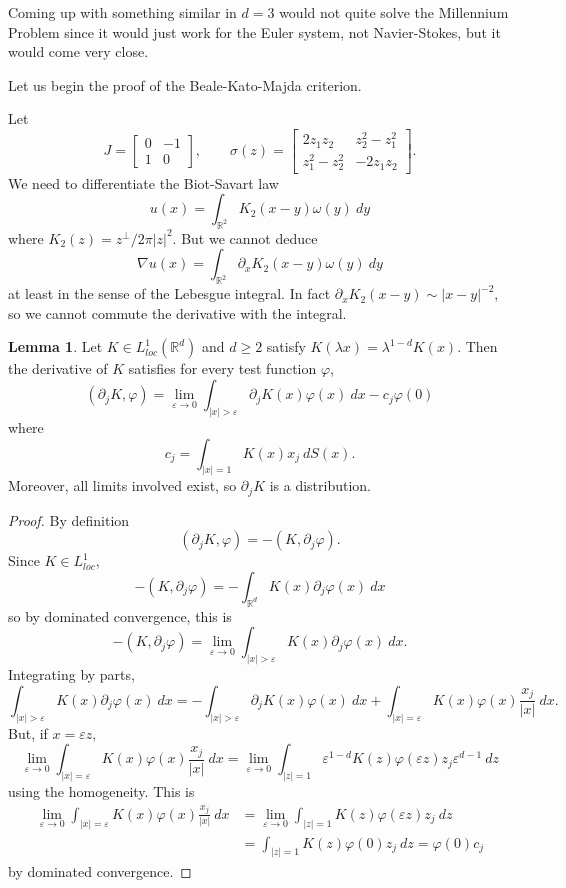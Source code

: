 \documentclass[12pt]{book}
\newcommand{\RR}{\mathbb{R}}
\theoremstyle{definition}
\newtheorem{lemma}[theorem]{Lemma}
\begin{document}
Coming up with something similar in $d = 3$ would not quite solve the Millennium Problem since it would just work for the Euler system, not Navier-Stokes, but it would come very close.

Let us begin the proof of the Beale-Kato-Majda criterion.

Let
$$J = \begin{bmatrix}0 & -1\\1 & 0\end{bmatrix}, \qquad \sigma(z) = \begin{bmatrix}2z_1z_2 & z_2^2 - z_1^2 \\ z_1^2 - z_2^2 & -2z_1z_2\end{bmatrix}.$$
We need to differentiate the Biot-Savart law
$$u(x) = \int_{\RR^2} K_2(x - y) \omega(y) ~dy$$
where $K_2(z) = z^\perp/2\pi|z|^2$. But we cannot deduce
$$\nabla u(x) = \int_{\RR^2} \partial_x K_2(x - y) \omega(y) ~dy$$
at least in the sense of the Lebesgue integral. In fact $\partial_x K_2(x - y) \sim |x - y|^{-2}$, so we cannot commute the derivative with the integral.

\begin{lemma}
Let $K \in L^1_{loc}(\RR^d)$ and $d \geq 2$ satisfy $K(\lambda x) = \lambda^{1-d} K(x)$.
Then the derivative of $K$ satisfies for every test function $\varphi$,
$$(\partial_j K, \varphi) = \lim_{\varepsilon \to 0} \int_{|x| > \varepsilon} \partial_j K(x) \varphi(x) ~dx - c_j\varphi(0)$$
where
$$c_j = \int_{|x| = 1} K(x) x_j ~dS(x).$$
Moreover, all limits involved exist, so $\partial_j K$ is a distribution.
\end{lemma}
\begin{proof}
By definition
$$(\partial_j K, \varphi) = -(K, \partial_j\varphi).$$
Since $K \in L^1_{loc}$,
$$-(K, \partial_j\varphi) = -\int_{\RR^d} K(x) \partial_j \varphi(x) ~dx$$
so by dominated convergence, this is
$$-(K, \partial_j\varphi) = \lim_{\varepsilon \to 0} \int_{|x| > \varepsilon} K(x) \partial_j \varphi(x) ~dx.$$
Integrating by parts,
$$ \int_{|x| > \varepsilon} K(x) \partial_j \varphi(x) ~dx = -\int_{|x| > \varepsilon} \partial_j K(x) \varphi(x) ~dx + \int_{|x| = \varepsilon} K(x) \varphi(x) \frac{x_j}{|x|} ~dx.$$
But, if $x = \varepsilon z$,
$$\lim_{\varepsilon \to 0} \int_{|x| = \varepsilon} K(x) \varphi(x) \frac{x_j}{|x|} ~dx = \lim_{\varepsilon \to 0} \int_{|z| = 1} \varepsilon^{1 - d} K(z) \varphi(\varepsilon z) z_j \varepsilon^{d - 1} ~dz$$
using the homogeneity.
This is
\begin{align*}
\lim_{\varepsilon \to 0} \int_{|x| = \varepsilon} K(x) \varphi(x) \frac{x_j}{|x|} ~dx &= \lim_{\varepsilon \to 0} \int_{|z| = 1} K(z) \varphi(\varepsilon z) z_j ~dz\\
&= \int_{|z| = 1}  K(z) \varphi(0) z_j ~dz = \varphi(0) c_j
\end{align*}
by dominated convergence.
\end{proof}
\end{document}
